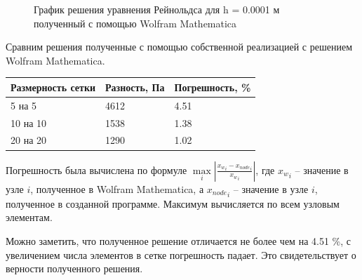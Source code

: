 \documentclass[12pt, a4paper]{article}
\begin{document}
\begin{figure}[!htbp]
	\caption{График решения уравнения Рейнольдса для h = 0.0001 м полученный с помощью Wolfram Mathematica}
	\label{exactSolutionConst}
\end{figure}

Сравним решения полученные с помощью собственной реализацией с решением Wolfram Mathematica.

\begin{table}[!htbp]
	\begin{tabular}{|l|l|l|}
		\hline
		\multicolumn{1}{|c|}{Размерность сетки} & \multicolumn{1}{c|}{Разность, Па} & Погрешность, \% \\ \hline
		5 на 5                                  & 4612                              & 4.51            \\ \hline
		10 на 10                                & 1538                              & 1.38            \\ \hline
		20 на 20                                & 1290                              & 1.02            \\ \hline
	\end{tabular}
\end{table}

Погрешность была вычислена по формуле $\underset{i}{\max} | \frac{{x_w}_i - {x_{node}}_i}{{x_w}_i} |$, где ${x_w}_i$ -- значение в узле $i$, полученное в Wolfram Mathematica, а ${x_{node}}_i$ -- значение в узле $i$, полученное в созданной программе. Максимум вычисляется по всем узловым элементам.

Можно заметить, что полученное решение отличается не более чем на 4.51 \%, с увеличением числа элементов в сетке погрешность падает. Это свидетельствует о верности полученного решения. 

\newpage
\end{document}
